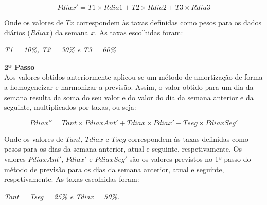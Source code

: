 \begin{displaymath} 
	Pdiax'= T1 \times Rdia1 + T2 \times Rdia2 + T3 \times Rdia3
\end{displaymath}

Onde os valores de $Tx$ correspondem às taxas definidas como pesos para os dados diários ($Rdiax$) da semana $x$. As taxas escolhidas foram: 
\begin{center}
	\textit{T1 = 10\%, T2 = 30\% e T3 = 60\%}
\end{center}


\textbf{2º Passo}\\
Aos valores obtidos anteriormente aplicou-se um método de amortização de forma a homogeneizar e harmonizar a previsão. Assim, o valor obtido para um dia da semana resulta da soma do seu valor e do valor do dia da semana anterior e da seguinte, multiplicados por taxas, ou seja: 

\begin{displaymath} 
	Pdiax''= Tant \times PdiaxAnt' + Tdiax \times Pdiax' + Tseg \times PdiaxSeg'
\end{displaymath}

Onde os valores de $Tant$, $Tdiax$ e $Tseg$ correspondem às taxas definidas como pesos para os dias da semana anterior, atual e seguinte, respetivamente. Os valores $PdiaxAnt'$, $Pdiax'$ e $PdiaxSeg'$ são os valores previstos no 1º passo do método de previsão para os dias da semana anterior, atual e seguinte, respetivamente. As taxas escolhidas foram: 

\begin{center}
	\textit{Tant = Tseg = 25\%  e Tdiax = 50\%.}
\end{center}
 

